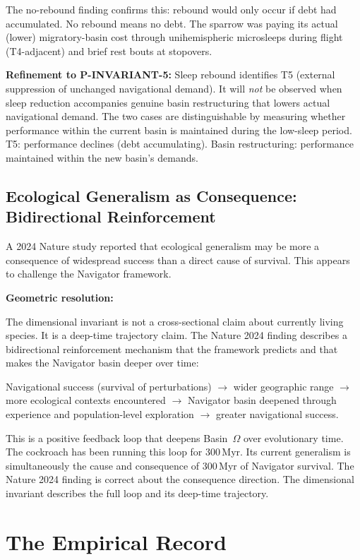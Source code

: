 \documentclass[10pt, a4paper]{article}
\begin{document}
The no-rebound finding confirms this:
rebound would only occur if debt had
accumulated. No rebound means no debt.
The sparrow was paying its actual
(lower) migratory-basin cost through
unihemispheric microsleeps during flight
(T4-adjacent) and brief rest bouts at
stopovers.

\textbf{Refinement to P-INVARIANT-5:}
Sleep rebound identifies T5 (external
suppression of unchanged navigational
demand). It will \textit{not} be observed
when sleep reduction accompanies genuine
basin restructuring that lowers actual
navigational demand. The two cases are
distinguishable by measuring whether
performance within the current basin is
maintained during the low-sleep period.
T5: performance declines (debt
accumulating). Basin restructuring:
performance maintained within the new
basin's demands.

\subsection{Ecological Generalism as
Consequence: Bidirectional Reinforcement}

A 2024 Nature study reported that
ecological generalism may be more a
consequence of widespread success than
a direct cause of survival. This appears
to challenge the Navigator framework.

\textbf{Geometric resolution:}

The dimensional invariant is not a
cross-sectional claim about currently
living species. It is a deep-time
trajectory claim. The Nature 2024
finding describes a bidirectional
reinforcement mechanism that the
framework predicts and that makes
the Navigator basin deeper over time:

Navigational success (survival of
perturbations) $\rightarrow$ wider
geographic range $\rightarrow$ more
ecological contexts encountered
$\rightarrow$ Navigator basin deepened
through experience and population-level
exploration $\rightarrow$ greater
navigational success.

This is a positive feedback loop that
deepens Basin~$\Omega$ over evolutionary
time. The cockroach has been running this
loop for 300\,Myr. Its current generalism
is simultaneously the cause and consequence
of 300\,Myr of Navigator survival. The
Nature 2024 finding is correct about the
consequence direction. The dimensional
invariant describes the full loop and
its deep-time trajectory.

\section{The Empirical Record}
\label{sec:empirical}
\end{document}
